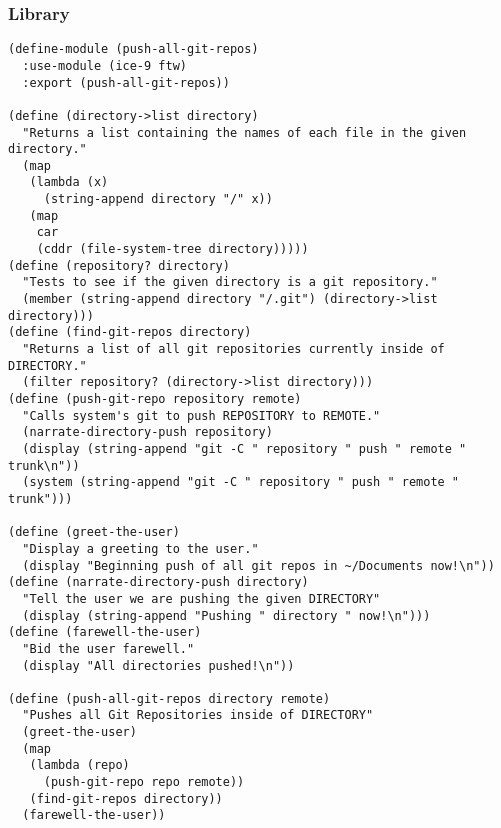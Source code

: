\documentclass[11pt]{article}
\begin{document}
\subsubsection{Library}
\label{sec:org59cda1d}
\begin{verbatim}
(define-module (push-all-git-repos)
  :use-module (ice-9 ftw)
  :export (push-all-git-repos))

(define (directory->list directory)
  "Returns a list containing the names of each file in the given directory."
  (map
   (lambda (x)
     (string-append directory "/" x))
   (map
    car
    (cddr (file-system-tree directory)))))
(define (repository? directory)
  "Tests to see if the given directory is a git repository."
  (member (string-append directory "/.git") (directory->list directory)))
(define (find-git-repos directory)
  "Returns a list of all git repositories currently inside of DIRECTORY."
  (filter repository? (directory->list directory)))
(define (push-git-repo repository remote)
  "Calls system's git to push REPOSITORY to REMOTE."
  (narrate-directory-push repository)
  (display (string-append "git -C " repository " push " remote " trunk\n"))
  (system (string-append "git -C " repository " push " remote " trunk")))

(define (greet-the-user)
  "Display a greeting to the user."
  (display "Beginning push of all git repos in ~/Documents now!\n"))
(define (narrate-directory-push directory)
  "Tell the user we are pushing the given DIRECTORY"
  (display (string-append "Pushing " directory " now!\n")))
(define (farewell-the-user)
  "Bid the user farewell."
  (display "All directories pushed!\n"))

(define (push-all-git-repos directory remote)
  "Pushes all Git Repositories inside of DIRECTORY"
  (greet-the-user)
  (map
   (lambda (repo)
     (push-git-repo repo remote))
   (find-git-repos directory))
  (farewell-the-user))
\end{verbatim}
\end{document}
